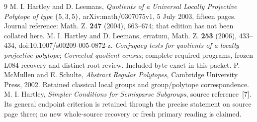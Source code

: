 \documentclass[11pt,a4paper]{article}
\begin{document}
\begin{thebibliography}{9}
 M. I. Hartley and D. Leemans, \emph{Quotients of a Universal Locally Projective Polytope of type $\{5,3,5\}$}, arXiv:math/0307075v1, 5 July 2003, fifteen pages. Journal reference: Math. Z. \textbf{247} (2004), 663--674; that edition has not been collated here.
 M. I. Hartley and D. Leemans, erratum, Math. Z. \textbf{253} (2006), 433--434, doi:10.1007/s00209-005-0872-z.
 \emph{Conjugacy tests for quotients of a locally projective polytope}; \emph{Corrected quotient census}; complete required programs, frozen L084 recovery and distinct root review. Included byte-exact in this packet.
 P. McMullen and E. Schulte, \emph{Abstract Regular Polytopes}, Cambridge University Press, 2002. Retained classical local groups and group/polytope correspondence.
 M. I. Hartley, \emph{Simpler Conditions for Semisparse Subgroups}, source reference~[7]. Its general endpoint criterion is retained through the precise statement on source page three; no new whole-source recovery or fresh primary reading is claimed.
\end{thebibliography}
\end{document}
